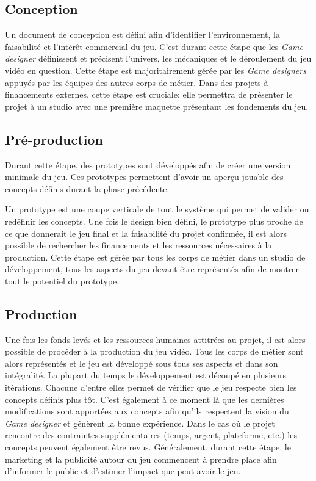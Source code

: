 \subsection{Conception}

Un document de conception est défini afin d'identifier l'environnement, la faisabilité et l'intérêt commercial du jeu. C'est durant cette étape que les \emph{Game designer} définissent et précisent l'univers, les mécaniques et le déroulement du jeu vidéo en question. Cette étape est majoritairement gérée par les \emph{Game designers} appuyés par les équipes des autres corps de métier. Dans des projets à financements externes, cette étape est cruciale: elle permettra de présenter le projet à un studio avec une première maquette présentant les fondements du jeu.

\subsection{Pré-production}
Durant cette étape, des prototypes sont développés afin de créer une version minimale du jeu. Ces prototypes permettent d'avoir un aperçu jouable des concepts définis durant la phase précédente. 

Un prototype est une coupe verticale de tout le système qui permet de valider ou redéfinir les concepts. Une fois le design bien défini, le prototype plus proche de ce que donnerait le jeu final et la faisabilité du projet confirmée, il est alors possible de rechercher les financements et les ressources nécessaires à la production. Cette étape est gérée par tous les corps de métier dans un studio de développement, tous les aspects du jeu devant être représentés afin de montrer tout le potentiel du prototype.

\subsection{Production}
Une fois les fonds levés et les ressources humaines attitrées au projet, il est alors possible de procéder à la production du jeu vidéo. Tous les corps de métier sont alors représentés et le jeu est développé sous tous ses aspects et dans son intégralité. La plupart du temps le développement est découpé en plusieurs itérations. Chacune d'entre elles permet de vérifier que le jeu respecte bien les concepts définis plus tôt. C'est également à ce moment là que les dernières modifications sont apportées aux concepts afin qu'ils respectent la vision du \emph{Game designer} et génèrent la bonne expérience. Dans le cas o\`u le projet rencontre des contraintes supplémentaires (temps, argent, plateforme, etc.) les concepts peuvent également être revus. Généralement, durant cette étape, le marketing et la publicité autour du jeu commencent à prendre place afin d'informer le public et d'estimer l'impact que peut avoir le jeu.


